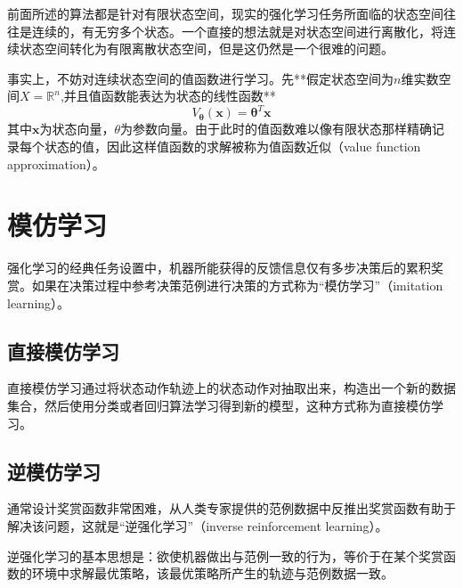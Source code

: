 前面所述的算法都是针对有限状态空间，现实的强化学习任务所面临的状态空间往往是连续的，有无穷多个状态。一个直接的想法就是对状态空间进行离散化，将连续状态空间转化为有限离散状态空间，但是这仍然是一个很难的问题。

事实上，不妨对连续状态空间的值函数进行学习。先**假定状态空间为$n$维实数空间$X=\mathbb R^n$,并且值函数能表达为状态的线性函数**
\begin{equation}
V_{\mathbf \theta}(\mathbf x)=\mathbf\theta^T\mathbf x
\end{equation}
其中$\mathbf x$为状态向量，$\theta$为参数向量。由于此时的值函数难以像有限状态那样精确记录每个状态的值，因此这样值函数的求解被称为值函数近似（value function approximation）。

\section{模仿学习}

强化学习的经典任务设置中，机器所能获得的反馈信息仅有多步决策后的累积奖赏。如果在决策过程中参考决策范例进行决策的方式称为``模仿学习''（imitation learning）。

\subsection{直接模仿学习}

直接模仿学习通过将状态动作轨迹上的状态动作对抽取出来，构造出一个新的数据集合，然后使用分类或者回归算法学习得到新的模型，这种方式称为直接模仿学习。

\subsection{逆模仿学习}

通常设计奖赏函数非常困难，从人类专家提供的范例数据中反推出奖赏函数有助于解决该问题，这就是``逆强化学习''（inverse reinforcement learning）。

逆强化学习的基本思想是：欲使机器做出与范例一致的行为，等价于在某个奖赏函数的环境中求解最优策略，该最优策略所产生的轨迹与范例数据一致。